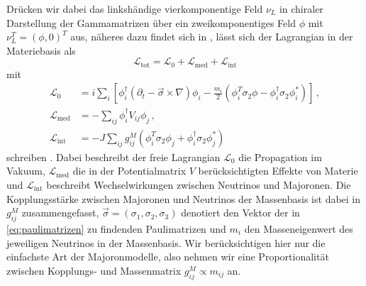 Drücken wir dabei das linkshändige vierkomponentige Feld $\nu_L$ in chiraler Darstellung der Gammamatrizen über ein zweikomponentiges Feld $\phi$ mit $\nu^T_L = (\phi, 0)^T$ aus, 
näheres dazu findet sich in \cite{komponentendinger}, lässt sich der Lagrangian in der Materiebasis als
\begin{equation}
    \mathcal{L}_\text{tot} = \mathcal{L}_0 + \mathcal{L}_\text{med} + \mathcal{L}_\text{int}
    \label{eq:materielagrange}
\end{equation}
mit
\begin{align*}
    \mathcal{L}_0          &=   i \sum_i \left[\phi^\dagger_i \left(\partial_t - \vec{\sigma} \times \nabla \right) \phi_i - \frac{m_i}{2} \left(\phi^T_i \sigma_2 \phi - \phi^\dagger_i \sigma_2 \phi^*_i\right) \right] \,,\\
    \mathcal{L}_\text{med} &= - \sum_{i j} \phi^\dagger_i V_{i j} \phi_j  \,,\\
    \mathcal{L}_\text{int} &= - J \sum_{i j} g^M_{i j} \left( \phi^T_i \sigma_2 \phi_j + \phi^\dagger_i \sigma_2 \phi^*_j \right)
\end{align*}
schreiben \cite{päspaper}.
Dabei beschreibt der freie Lagrangian $\mathcal{L}_0$ die Propagation im Vakuum, $\mathcal{L}_\text{med}$ die in der Potentialmatrix $V$ berücksichtigten Effekte von Materie und $\mathcal{L}_\text{int}$
beschreibt Wechselwirkungen zwischen Neutrinos und Majoronen.
Die Kopplungsstärke zwischen Majoronen und Neutrinos der Massenbasis ist dabei in $g^M_{i j}$ zusammengefasst, $\vec{\sigma} = (\sigma_1, \sigma_2, \sigma_3)$ denotiert den Vektor der in \eqref{eq:paulimatrizen} zu findenden Paulimatrizen
und $m_i$ den Masseneigenwert des jeweiligen Neutrinos in der Massenbasis.
Wir berücksichtigen hier nur die einfachste Art der Majoronmodelle, also nehmen wir eine Proportionalität zwischen Kopplungs- und Massenmatrix $g^M_{i j} \propto m_{i j}$ an.

